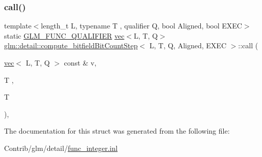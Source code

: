 \subsubsection{\texorpdfstring{call()}{call()}}
{\footnotesize\ttfamily template$<$length\+\_\+t L, typename T , qualifier Q, bool Aligned, bool E\+X\+EC$>$ \\
static \mbox{\hyperlink{setup_8hpp_a33fdea6f91c5f834105f7415e2a64407}{G\+L\+M\+\_\+\+F\+U\+N\+C\+\_\+\+Q\+U\+A\+L\+I\+F\+I\+ER}} \mbox{\hyperlink{structglm_1_1vec}{vec}}$<$L, T, Q$>$ \mbox{\hyperlink{structglm_1_1detail_1_1compute__bitfield_bit_count_step}{glm\+::detail\+::compute\+\_\+bitfield\+Bit\+Count\+Step}}$<$ L, T, Q, Aligned, E\+X\+EC $>$\+::call (\begin{DoxyParamCaption}\item[{\mbox{\hyperlink{structglm_1_1vec}{vec}}$<$ L, T, Q $>$ const \&}]{v,  }\item[{T}]{,  }\item[{T}]{ }\end{DoxyParamCaption})\hspace{0.3cm}{\ttfamily [inline]}, {\ttfamily [static]}}



The documentation for this struct was generated from the following file\+:\begin{DoxyCompactItemize}
\item 
Contrib/glm/detail/\mbox{\hyperlink{func__integer_8inl}{func\+\_\+integer.\+inl}}\end{DoxyCompactItemize}
